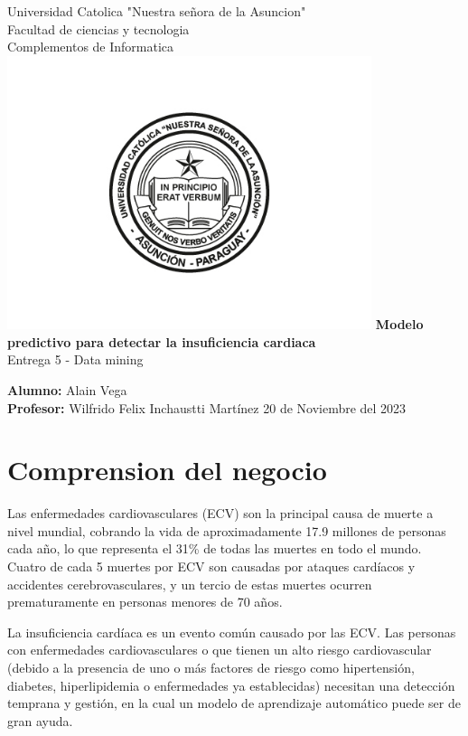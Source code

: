 \documentclass[12pt, letterpaper]{article}
\begin{document}
\begin{titlepage}
  \begin{center}
      \Large{Universidad Catolica "Nuestra señora de la Asuncion" \\
      Facultad de ciencias y tecnologia \\
      Complementos de Informatica}
      \includegraphics[width=0.8\textwidth]{UcaLogo.jpg}
      \LARGE{\textbf{Modelo predictivo para detectar la insuficiencia cardiaca
      }} \\
      \Large{Entrega 5 - Data mining}
      \vspace{1cm}
  \end{center}
      \large
      \textbf{Alumno: }Alain Vega \\
      \textbf{Profesor: }Wilfrido Felix Inchaustti Martínez
      \vfill
      \hfill{20 de Noviembre del 2023}
\end{titlepage}


\newpage
\tableofcontents %
\newpage

\section{Comprension del negocio}
Las enfermedades cardiovasculares (ECV) son la principal causa de muerte a nivel mundial, 
cobrando la vida de aproximadamente 17.9 millones de personas cada año, 
lo que representa el 31\% de todas las muertes en todo el mundo. 
Cuatro de cada 5 muertes por ECV son causadas por ataques cardíacos y accidentes cerebrovasculares, 
y un tercio de estas muertes ocurren prematuramente en personas menores de 70 años. 

La insuficiencia cardíaca es un evento común causado por las ECV.
Las personas con enfermedades cardiovasculares o que tienen un alto riesgo cardiovascular 
(debido a la presencia de uno o más factores de riesgo como hipertensión, diabetes, 
hiperlipidemia o enfermedades ya establecidas) necesitan una detección temprana y gestión, 
en la cual un modelo de aprendizaje automático puede ser de gran ayuda. 
\cite*{dataset}
\end{document}
